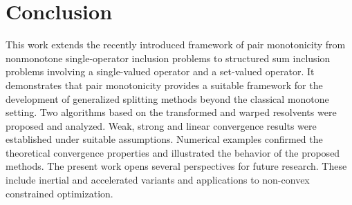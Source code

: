\documentclass[11pt]{article}
\theoremstyle{definition}
\theoremstyle{definition}
\theoremstyle{definition}
\begin{document}
\section{Conclusion}\label{sec5}
{This work extends the recently introduced framework of pair monotonicity from nonmonotone single-operator inclusion problems to structured sum inclusion problems involving a single-valued operator and a set-valued operator. It demonstrates that pair monotonicity provides a suitable framework for the development of generalized  splitting methods beyond the classical monotone setting. 
Two algorithms based on the transformed and warped resolvents were proposed and analyzed. Weak, strong and linear convergence results were established under suitable assumptions. Numerical examples confirmed the theoretical convergence properties and illustrated the behavior of the proposed methods.
The present work opens several perspectives for future research. These include inertial and accelerated variants and applications to non-convex constrained optimization.}
\end{document}
